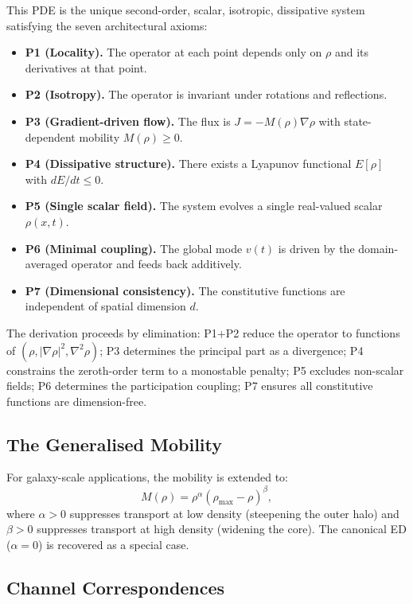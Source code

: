 \documentclass[12pt,letterpaper]{article}
\begin{document}
This PDE is the unique second-order, scalar, isotropic, dissipative system satisfying the seven architectural axioms:

\begin{itemize}[leftmargin=2em, itemsep=2pt]
\item \textbf{P1 (Locality).} The operator at each point depends only on $\rho$ and its derivatives at that point.
\item \textbf{P2 (Isotropy).} The operator is invariant under rotations and reflections.
\item \textbf{P3 (Gradient-driven flow).} The flux is $J = -M(\rho)\nabla\rho$ with state-dependent mobility $M(\rho) \geq 0$.
\item \textbf{P4 (Dissipative structure).} There exists a Lyapunov functional $E[\rho]$ with $dE/dt \leq 0$.
\item \textbf{P5 (Single scalar field).} The system evolves a single real-valued scalar $\rho(x,t)$.
\item \textbf{P6 (Minimal coupling).} The global mode $v(t)$ is driven by the domain-averaged operator and feeds back additively.
\item \textbf{P7 (Dimensional consistency).} The constitutive functions are independent of spatial dimension $d$.
\end{itemize}

The derivation proceeds by elimination: P1+P2 reduce the operator to functions of $(\rho, |\nabla\rho|^2, \nabla^2\rho)$; P3 determines the principal part as a divergence; P4 constrains the zeroth-order term to a monostable penalty; P5 excludes non-scalar fields; P6 determines the participation coupling; P7 ensures all constitutive functions are dimension-free.

\subsection{The Generalised Mobility}

For galaxy-scale applications, the mobility is extended to:
\begin{equation}
M(\rho) = \rho^\alpha(\rho_{\max}-\rho)^\beta, \label{eq:gen_mob}
\end{equation}
where $\alpha > 0$ suppresses transport at low density (steepening the outer halo) and $\beta > 0$ suppresses transport at high density (widening the core). The canonical ED ($\alpha = 0$) is recovered as a special case.

\subsection{Channel Correspondences}
\end{document}
